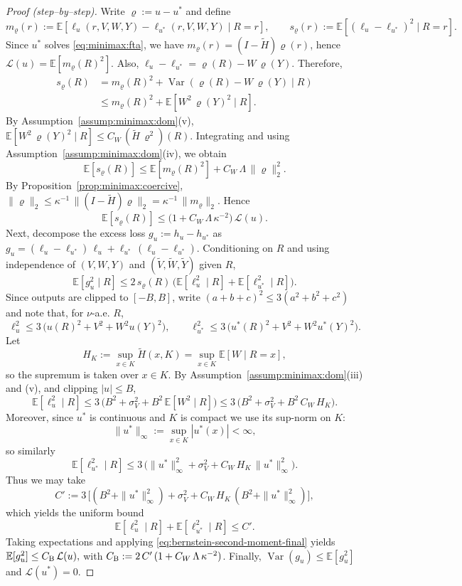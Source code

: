 \documentclass[pdflatex,sn-mathphys-ay]{sn-jnl}%
\numberwithin{equation}{section}
\theoremstyle{thmstyleone}%
\theoremstyle{thmstyletwo}%
\theoremstyle{thmstylethree}%
\begin{document}
\begin{proof}[Proof (step–by–step)]
Write \(\varrho:=u-u^*\) and define
\[
m_{\varrho}(r):=\mathbb{E}[\ell_u(r,V,W,Y)-\ell_{u^*}(r,V,W,Y)\mid R=r],\qquad
s_{\varrho}(r):=\mathbb{E}[(\ell_u-\ell_{u^*})^2\mid R=r].
\]
Since \(u^*\) solves \eqref{eq:minimax:fta}, we have \(m_{\varrho}(r)=(I-\tilde H)\varrho(r)\), hence \(\mathcal{L}(u)=\mathbb{E}[m_{\varrho}(R)^2]\). Also,
\(
\ell_u-\ell_{u^*}=\varrho(R)-W\,\varrho(Y).
\)
Therefore,
\begin{align}
s_{\varrho}(R) &= m_{\varrho}(R)^2 + \operatorname{Var}(\varrho(R)-W\,\varrho(Y)\mid R) \\
&\le m_{\varrho}(R)^2 + \mathbb{E}[W^2\,\varrho(Y)^2\mid R].
\end{align}
By Assumption~\ref{assump:minimax:dom}(v), \(\mathbb{E}[W^2\,\varrho(Y)^2\mid R]\le C_W\,(\tilde H\,\varrho^2)(R)\). Integrating and using Assumption~\ref{assump:minimax:dom}(iv), we obtain
\[
\mathbb{E}[s_{\varrho}(R)] \le \mathbb{E}[m_{\varrho}(R)^2] + C_W\,\Lambda\,\|\varrho\|_2^2.
\]
By Proposition~\ref{prop:minimax:coercive}, \(\|\varrho\|_2\le \kappa^{-1}\,\|(I-\tilde H)\varrho\|_2=\kappa^{-1}\,\|m_{\varrho}\|_2\). Hence
\begin{equation}\label{eq:bernstein-second-moment-final}
\mathbb{E}[s_{\varrho}(R)] \le \Big(1 + C_W\,\Lambda\,\kappa^{-2}\Big)\,\mathcal{L}(u).
\end{equation}
Next, decompose the excess loss \(g_u:=h_u-h_{u^*}\) as
\(
g_u=(\ell_u-\ell_{u^*})\,\ell_u + \ell_{u^*}\,(\ell_u-\ell_{u^*}).
\)
Conditioning on \(R\) and using independence of \((V,W,Y)\) and \((\tilde V,\tilde W,\tilde Y)\) given \(R\),
\[
\mathbb{E}[g_u^2\mid R] \le 2\,s_{\varrho}(R)\,\Big(\mathbb{E}[\ell_u^2\mid R] + \mathbb{E}[\ell_{u^*}^2\mid R]\Big).
\]
Since outputs are clipped to \([-B,B]\), write \((a+b+c)^2\le 3(a^2+b^2+c^2)\) and note that, for \(\nu\)-a.e. \(R\),
\[
\ell_u^2 \le 3\,\big(u(R)^2 + V^2 + W^2 u(Y)^2\big),\qquad \ell_{u^*}^2 \le 3\,\big(u^*(R)^2 + V^2 + W^2 u^*(Y)^2\big).
\]
Let
\[
H_K := \sup_{x\in K} \tilde H(x,K) = \sup_{x\in K} \mathbb{E}[W\mid R=x],
\]
so the supremum is taken over \(x\in K\). By Assumption~\ref{assump:minimax:dom}(iii) and (v), and clipping \(|u|\le B\),
\[
\mathbb{E}[\ell_u^2\mid R] \le 3\,\big(B^2 + \sigma_V^2 + B^2\,\mathbb{E}[W^2\mid R]\big) \le 3\,\big(B^2 + \sigma_V^2 + B^2\,C_W\,H_K\big).
\]
Moreover, since \(u^*\) is continuous and $K$ is compact we use its sup-norm on \(K\):
\[
\|u^*\|_\infty := \sup_{x\in K} |u^*(x)| < \infty,
\]
so similarly
\[
\mathbb{E}[\ell_{u^*}^2\mid R] \le 3\,\big(\|u^*\|_\infty^2 + \sigma_V^2 + C_W\,H_K\,\|u^*\|_\infty^2\big).
\]
Thus we may take
\[
C' := 3\,\Big[(B^2+\|u^*\|_\infty^2) + \sigma_V^2 + C_W\,H_K\,(B^2+\|u^*\|_\infty^2)\Big],
\]
which yields the uniform bound
\[
\mathbb{E}[\ell_u^2\mid R] + \mathbb{E}[\ell_{u^*}^2\mid R] \le C'.
\]
Taking expectations and applying \eqref{eq:bernstein-second-moment-final} yields
\(
\mathbb{E}[g_u^2] \le C_{\rm B}\,\mathcal{L}(u),
\)
with \(C_{\rm B}:=2\,C'\,(1 + C_W\,\Lambda\,\kappa^{-2})\). Finally, \(\operatorname{Var}(g_u)\le \mathbb{E}[g_u^2]\) and \(\mathcal{L}(u^*)=0\).
\end{proof}
\end{document}
